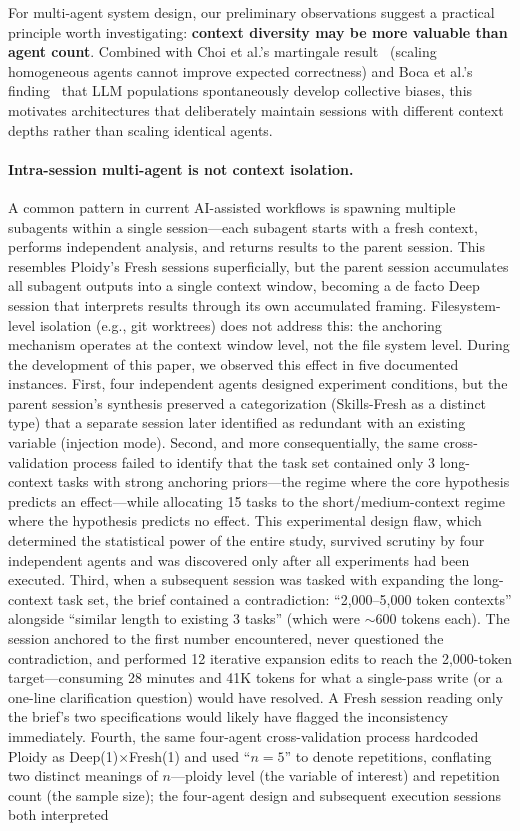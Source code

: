 \documentclass[11pt]{article}
\begin{document}
For multi-agent system design, our preliminary observations suggest a practical principle worth investigating: \textbf{context diversity may be more valuable than agent count}. Combined with Choi et al.'s martingale result~\citep{choi2025debate} (scaling homogeneous agents cannot improve expected correctness) and Boca et al.'s finding~\citep{boca2025emergent} that LLM populations spontaneously develop collective biases, this motivates architectures that deliberately maintain sessions with different context depths rather than scaling identical agents.

\paragraph{Intra-session multi-agent is not context isolation.}
A common pattern in current AI-assisted workflows is spawning multiple subagents within a single session---each subagent starts with a fresh context, performs independent analysis, and returns results to the parent session. This resembles Ploidy's Fresh sessions superficially, but the parent session accumulates all subagent outputs into a single context window, becoming a de facto Deep session that interprets results through its own accumulated framing. Filesystem-level isolation (e.g., git worktrees) does not address this: the anchoring mechanism operates at the context window level, not the file system level. During the development of this paper, we observed this effect in five documented instances. First, four independent agents designed experiment conditions, but the parent session's synthesis preserved a categorization (Skills-Fresh as a distinct type) that a separate session later identified as redundant with an existing variable (injection mode). Second, and more consequentially, the same cross-validation process failed to identify that the task set contained only 3 long-context tasks with strong anchoring priors---the regime where the core hypothesis predicts an effect---while allocating 15 tasks to the short/medium-context regime where the hypothesis predicts no effect. This experimental design flaw, which determined the statistical power of the entire study, survived scrutiny by four independent agents and was discovered only after all experiments had been executed. Third, when a subsequent session was tasked with expanding the long-context task set, the brief contained a contradiction: ``2,000--5,000 token contexts'' alongside ``similar length to existing 3 tasks'' (which were $\sim$600 tokens each). The session anchored to the first number encountered, never questioned the contradiction, and performed 12 iterative expansion edits to reach the 2,000-token target---consuming 28 minutes and 41K tokens for what a single-pass write (or a one-line clarification question) would have resolved. A Fresh session reading only the brief's two specifications would likely have flagged the inconsistency immediately. Fourth, the same four-agent cross-validation process hardcoded Ploidy as Deep(1)$\times$Fresh(1) and used ``$n{=}5$'' to denote repetitions, conflating two distinct meanings of $n$---ploidy level (the variable of interest) and repetition count (the sample size); the four-agent design and subsequent execution sessions both interpreted 
\end{document}
